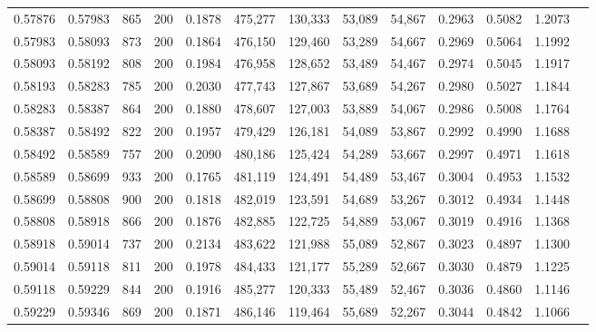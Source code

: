 \begin{tabular}{rrrrrrrrrrrrr}
0.57876 & 0.57983 &   865 & 200 &                                     0.1878 & 475,277 & 130,333 &  53,089 &  54,867 & 0.2963 & 0.5082 & 1.2073 \\
0.57983 & 0.58093 &   873 & 200 &                                     0.1864 & 476,150 & 129,460 &  53,289 &  54,667 & 0.2969 & 0.5064 & 1.1992 \\
0.58093 & 0.58192 &   808 & 200 &                                     0.1984 & 476,958 & 128,652 &  53,489 &  54,467 & 0.2974 & 0.5045 & 1.1917 \\
0.58193 & 0.58283 &   785 & 200 &                                     0.2030 & 477,743 & 127,867 &  53,689 &  54,267 & 0.2980 & 0.5027 & 1.1844 \\
0.58283 & 0.58387 &   864 & 200 &                                     0.1880 & 478,607 & 127,003 &  53,889 &  54,067 & 0.2986 & 0.5008 & 1.1764 \\
0.58387 & 0.58492 &   822 & 200 &                                     0.1957 & 479,429 & 126,181 &  54,089 &  53,867 & 0.2992 & 0.4990 & 1.1688 \\
0.58492 & 0.58589 &   757 & 200 &                                     0.2090 & 480,186 & 125,424 &  54,289 &  53,667 & 0.2997 & 0.4971 & 1.1618 \\
0.58589 & 0.58699 &   933 & 200 &                                     0.1765 & 481,119 & 124,491 &  54,489 &  53,467 & 0.3004 & 0.4953 & 1.1532 \\
0.58699 & 0.58808 &   900 & 200 &                                     0.1818 & 482,019 & 123,591 &  54,689 &  53,267 & 0.3012 & 0.4934 & 1.1448 \\
0.58808 & 0.58918 &   866 & 200 &                                     0.1876 & 482,885 & 122,725 &  54,889 &  53,067 & 0.3019 & 0.4916 & 1.1368 \\
0.58918 & 0.59014 &   737 & 200 &                                     0.2134 & 483,622 & 121,988 &  55,089 &  52,867 & 0.3023 & 0.4897 & 1.1300 \\
0.59014 & 0.59118 &   811 & 200 &                                     0.1978 & 484,433 & 121,177 &  55,289 &  52,667 & 0.3030 & 0.4879 & 1.1225 \\
0.59118 & 0.59229 &   844 & 200 &                                     0.1916 & 485,277 & 120,333 &  55,489 &  52,467 & 0.3036 & 0.4860 & 1.1146 \\
0.59229 & 0.59346 &   869 & 200 &                                     0.1871 & 486,146 & 119,464 &  55,689 &  52,267 & 0.3044 & 0.4842 & 1.1066 \\

\end{tabular}

